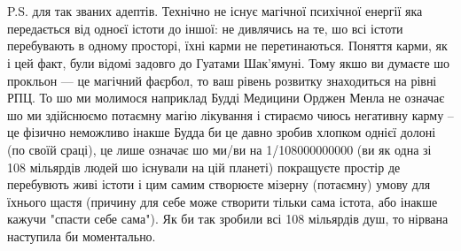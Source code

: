 \\
\\
P.S. для так званих адептів. Технічно не існує магічної психічної енергії яка передається від одноєї істоти до іншої: не дивлячись на те, шо всі істоти перебувають в одному просторі, їхні карми не перетинаються. Поняття карми, як і цей факт, були відомі задовго до Гуатами Шак'ямуні. Тому якшо ви думаєте шо прокльон — це магічний фаєрбол, то ваш рівень розвитку знаходиться на рівні РПЦ. То шо ми молимося наприклад Будді Медицини Орджен Менла не означає шо ми здійснюємо потаємну магію лікування і стираємо чиюсь негативну карму -- це фізично неможливо інакше Будда би це давно зробив хлопком однієї долоні (по своїй сраці), це лише означає шо ми/ви на 1/108000000000 (ви як одна зі 108 мільярдів людей шо існували на цій планеті) покращуєте простір де перебувють живі істоти і цим самим створюєте мізерну (потаємну) умову для їхнього щастя (причину для себе може створити тільки сама істота, або інакше кажучи "спасти себе сама"). Як би так зробили всі 108 мільярдів душ, то нірвана наступила би моментально.

\normalsize
